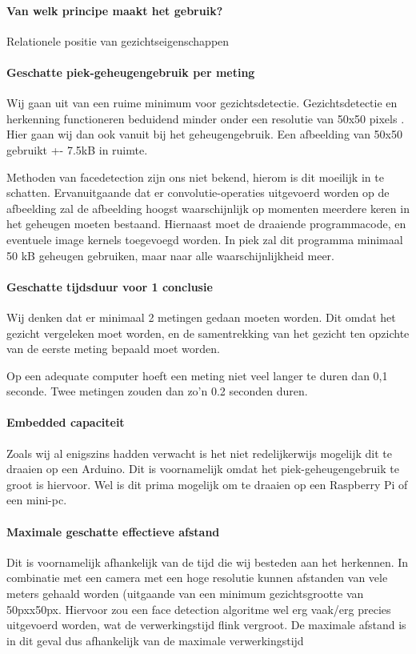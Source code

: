 \documentclass[11pt]{article}
\begin{document}
    \paragraph{Van welk principe maakt het gebruik?}
    Relationele positie van gezichtseigenschappen

    \paragraph{Geschatte piek-geheugengebruik per meting}
    Wij gaan uit van een ruime minimum voor gezichtsdetectie.
    Gezichtsdetectie en herkenning functioneren beduidend minder onder een resolutie van 50x50 pixels \citet{boom2006effect}.
    Hier gaan wij dan ook vanuit bij het geheugengebruik.
    Een afbeelding van 50x50 gebruikt +- 7.5kB in ruimte.

    Methoden van facedetection zijn ons niet bekend, hierom is dit moeilijk in te schatten.
    Ervanuitgaande dat er convolutie-operaties uitgevoerd worden op de afbeelding zal de afbeelding hoogst waarschijnlijk op momenten meerdere keren in het geheugen moeten bestaand.
    Hiernaast moet de draaiende programmacode, en eventuele image kernels toegevoegd worden.
    In piek zal dit programma minimaal 50 kB geheugen gebruiken, maar naar alle waarschijnlijkheid meer.

    \paragraph{Geschatte tijdsduur voor 1 conclusie}
    Wij denken dat er minimaal 2 metingen gedaan moeten worden.
    Dit omdat het gezicht vergeleken moet worden, en de samentrekking van het gezicht ten opzichte van de eerste meting bepaald moet worden.

    Op een adequate computer hoeft een meting niet veel langer te duren dan 0,1 seconde.
    Twee metingen zouden dan zo’n 0.2 seconden duren.

    \paragraph{Embedded capaciteit}
    Zoals wij al enigszins hadden verwacht is het niet redelijkerwijs mogelijk dit te draaien op een Arduino.
    Dit is voornamelijk omdat het piek-geheugengebruik te groot is hiervoor.
    Wel is dit prima mogelijk om te draaien op een Raspberry Pi of een mini-pc.

    \paragraph{Maximale geschatte effectieve afstand}
    Dit is voornamelijk afhankelijk van de tijd die wij besteden aan het herkennen.
    In combinatie met een camera met een hoge resolutie kunnen afstanden van vele meters gehaald worden (uitgaande van een minimum gezichtsgrootte van 50pxx50px.
    Hiervoor zou een face detection algoritme wel erg vaak/erg precies uitgevoerd worden, wat de verwerkingstijd flink vergroot.
    De maximale afstand is in dit geval dus afhankelijk van de maximale verwerkingstijd
\end{document}
